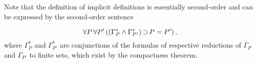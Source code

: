 Note that the definition of implicit definitions is essentially second-order 
and 
can be expressed by the second-order sentence
\begin{samepage}
\[ \forall P\,\forall P' \left(  \left(\Gamma^*_P \land \Gamma^*_{P'} \right) \operatorname{\supset} P=P'\right),\] 
where $\Gamma^*_P$ and $\Gamma^*_{P'}$ are conjunctions of the formulas of 
respective reductions of $\Gamma_P$ and $\Gamma_{P'}$ 
to finite sets, which exist by the compactness theorem.
\end{samepage}

